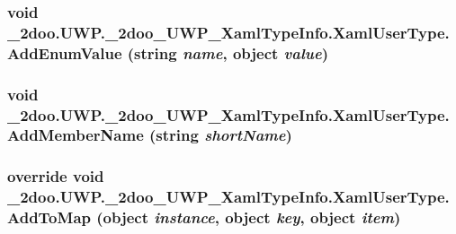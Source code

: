 \hypertarget{class__2doo_1_1_u_w_p_1_1__2doo___u_w_p___xaml_type_info_1_1_xaml_user_type_976877b61c19a9ad4723b034934a4e70}{
\subsubsection[{AddEnumValue}]{\setlength{\rightskip}{0pt plus 5cm}void \_\-2doo.UWP.\_\-2doo\_\-UWP\_\-XamlTypeInfo.XamlUserType.AddEnumValue (string {\em name}, \/  object {\em value})}}
\label{class__2doo_1_1_u_w_p_1_1__2doo___u_w_p___xaml_type_info_1_1_xaml_user_type_976877b61c19a9ad4723b034934a4e70}


\hypertarget{class__2doo_1_1_u_w_p_1_1__2doo___u_w_p___xaml_type_info_1_1_xaml_user_type_9097b2fedb19d90ef7bc1f7242357cba}{
\subsubsection[{AddMemberName}]{\setlength{\rightskip}{0pt plus 5cm}void \_\-2doo.UWP.\_\-2doo\_\-UWP\_\-XamlTypeInfo.XamlUserType.AddMemberName (string {\em shortName})}}
\label{class__2doo_1_1_u_w_p_1_1__2doo___u_w_p___xaml_type_info_1_1_xaml_user_type_9097b2fedb19d90ef7bc1f7242357cba}


\hypertarget{class__2doo_1_1_u_w_p_1_1__2doo___u_w_p___xaml_type_info_1_1_xaml_user_type_5211e893a0e0b5da3e33af22ee24dcdb}{
\subsubsection[{AddToMap}]{\setlength{\rightskip}{0pt plus 5cm}override void \_\-2doo.UWP.\_\-2doo\_\-UWP\_\-XamlTypeInfo.XamlUserType.AddToMap (object {\em instance}, \/  object {\em key}, \/  object {\em item})}}
\label{class__2doo_1_1_u_w_p_1_1__2doo___u_w_p___xaml_type_info_1_1_xaml_user_type_5211e893a0e0b5da3e33af22ee24dcdb}


